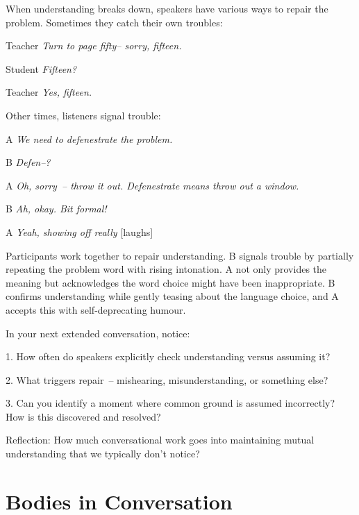 When understanding breaks down, speakers have various ways to repair the problem. Sometimes they catch their own troubles:

\ea
\begin{dialogue}
\item[Teacher] \textit{Turn to page fifty-- sorry, fifteen.}
\item[Student] \textit{Fifteen?}
\item[Teacher] \textit{Yes, fifteen.}
\end{dialogue}
\z
Other times, listeners signal trouble:

\ea
\begin{dialogue}
\item[A] \textit{We need to defenestrate the problem.}
\item[B] \textit{Defen--?}
\item[A] \textit{Oh, sorry~-- throw it out. Defenestrate means throw out a window.}
\item[B] \textit{Ah, okay. Bit formal!}
\item[A] \textit{Yeah, showing off really} [laughs]
\end{dialogue}
\z

Participants work together to repair understanding. B signals trouble by partially repeating the problem word with rising intonation. A not only provides the meaning but acknowledges the word choice might have been inappropriate. B confirms understanding while gently teasing about the language choice, and A accepts this with self-deprecating humour.

\begin{tcolorbox}[title=Exercise: Tracking Common Ground, colback=white, colframe=purple!75!black, fonttitle=\bfseries]
In your next extended conversation, notice:

1. How often do speakers explicitly check understanding versus assuming it?

2. What triggers repair~-- mishearing, misunderstanding, or something else?

3. Can you identify a moment where common ground is assumed incorrectly? How is this discovered and resolved?

Reflection: How much conversational work goes into maintaining mutual understanding that we typically don't notice?
\end{tcolorbox}

\section{Bodies in Conversation} \label{sec:bodies}

